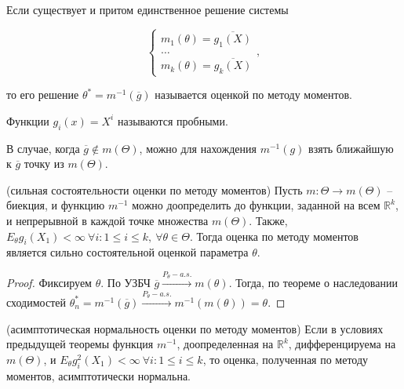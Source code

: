 \begin{definition}
Если существует и притом единственное решение системы


\begin{equation*}
\begin{cases}
m_{1}( \theta ) =\overline{g_{1}( X)}\\
\dotsc \\
m_{k}( \theta ) =\overline{g_{k}( X)}
\end{cases} ,
\end{equation*}


то его решение $\displaystyle \theta ^{*} =m^{-1}(\overline{g})$ называется оценкой по методу моментов.
\end{definition}
\begin{definition}
Функции $\displaystyle g_{i}( x) =X^{i}$ называются пробными.
\end{definition}
\begin{note}
В случае, когда $\displaystyle \overline{g} \notin m( \Theta )$, можно для нахождения $\displaystyle m^{-1}( g)$ взять ближайшую к $\displaystyle \overline{g}$ точку из $\displaystyle m( \Theta )$.
\end{note}
\begin{theorem}
(сильная состоятельности оценки по методу моментов) Пусть $\displaystyle m:\Theta \rightarrow m( \Theta )$ -- биекция, и функцию $\displaystyle m^{-1}$ можно доопределить до функции, заданной на всем $\displaystyle \mathbb{R}^{k}$, и непрерывной в каждой точке множества $\displaystyle m( \Theta )$. Также, $\displaystyle E_{\theta } g_{i}( X_{1}) < \infty \ \forall i:1\leqslant i\leqslant k,\ \forall \theta \in \Theta $. Тогда оценка по методу моментов является сильно состоятельной оценкой параметра $\displaystyle \theta $.
\end{theorem}
\begin{proof}
    Фиксируем $\theta$. По УЗБЧ $\displaystyle \overline{g}\xrightarrow{P_{\theta } -a.s.} m( \theta )$. Тогда, по теореме о наследовании сходимостей $\displaystyle \theta _{n}^{*} =m^{-1}(\overline{g})\xrightarrow{P_{\theta } -a.s.} m^{-1}( m( \theta )) =\theta $.
\end{proof}
\begin{theorem}
(асимптотическая нормальность оценки по методу моментов) Если в условиях предыдущей теоремы функция $\displaystyle m^{-1}$, доопределенная на $\displaystyle \mathbb{R}^{k}$, дифференцируема на $\displaystyle m( \Theta )$, и $\displaystyle E_{\theta } g_{i}^{2}( X_{1}) < \infty \ \forall i:1\leqslant i\leqslant k$, то оценка, полученная по методу моментов, асимптотически нормальна.
\end{theorem}
